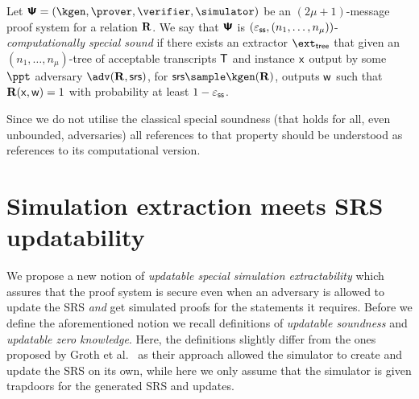 \documentclass[runningheads,11pt]{llncs}
\begin{document}
\begin{definition}
  Let $\proofsystem = (\kgen, \prover, \verifier, \simulator)$ be an
  $(2 \mu + 1)$-message proof system for a relation $\mathbf{R}$. We say that
  $\bm{\mathsf{\Psi}}$ is $(\varepsilon_{\mathsf{ss}}, (n_1, \ldots, n_\mu))$-\emph{computationally special sound}
  if there exists an extractor $\extt$ that given an $(n_1, \ldots, n_\mu)$-tree
  of acceptable transcripts $\mathsf{T}$ and instance $\mathsf{x}$ output by some $\ppt$ adversary $\adv(\REL,
  \srs)$, for $\srs \sample \kgen(\REL)$, outputs $\mathsf{w}$ such that $\mathbf{R}(\mathsf{x},
  \mathsf{w}) = 1$ with probability at least $1 - \varepsilon_{\mathsf{ss}}$.
\end{definition}

Since we do not utilise the classical special soundness (that holds for all,
even unbounded, adversaries) all references to that property should be
understood as references to its computational version.

\color{blueish}
\section{Simulation extraction meets SRS updatability}

We propose a new notion of \emph{updatable special simulation extractability} which
assures that the proof system is secure even when an adversary is allowed to
update the SRS \emph{and} get simulated proofs for the statements it
requires. Before we define the aforementioned notion we recall definitions of
\emph{updatable soundness} and \emph{updatable zero knowledge}. Here, the
definitions slightly differ from the ones proposed by Groth et
al.~\cite{C:GKMMM18} as their approach allowed the simulator to create and
update the SRS on its own, while here we only assume that the simulator is given
trapdoors for the generated SRS and updates.
\end{document}
